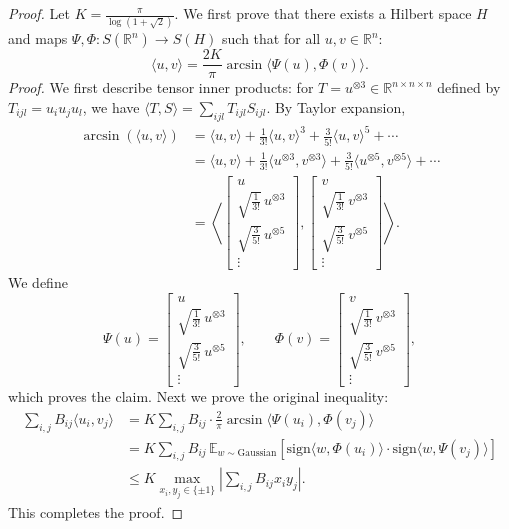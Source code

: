 \begin{proof}
Let $K = \frac{\pi}{\log(1 + \sqrt{2})}$.
We first prove that there exists a Hilbert space $H$ and maps $\Psi, \Phi : S(\mathbb{R}^n) \to S(H)$ such that for all $u, v \in \mathbb{R}^n$:
\[
\langle u, v \rangle = \frac{2K}{\pi} \arcsin \langle \Psi(u), \Phi(v) \rangle.
\]
\textit{Proof.} We first describe tensor inner products: for $T = u^{\otimes 3} \in \mathbb{R}^{n \times n \times n}$ defined by $T_{ijl} = u_i u_j u_l$, we have $\langle T, S \rangle = \sum_{ijl} T_{ijl} S_{ijl}$. By Taylor expansion,
\begin{align*}
\arcsin(\langle u, v \rangle) &= \langle u, v \rangle + \frac{1}{3!} \langle u, v \rangle^3 + \frac{3}{5!} \langle u, v \rangle^5 + \cdots \\
&= \langle u, v \rangle + \frac{1}{3!} \langle u^{\otimes 3}, v^{\otimes 3} \rangle + \frac{3}{5!} \langle u^{\otimes 5}, v^{\otimes 5} \rangle + \cdots \\
&= \left\langle 
\begin{bmatrix} u \\ \sqrt{\frac{1}{3!}}\, u^{\otimes 3} \\ \sqrt{\frac{3}{5!}}\, u^{\otimes 5} \\ \vdots \end{bmatrix},
\begin{bmatrix} v \\ \sqrt{\frac{1}{3!}}\, v^{\otimes 3} \\ \sqrt{\frac{3}{5!}}\, v^{\otimes 5} \\ \vdots \end{bmatrix}
\right\rangle.
\end{align*}
We define
\[
\Psi(u) = \begin{bmatrix} u \\ \sqrt{\frac{1}{3!}}\, u^{\otimes 3} \\ \sqrt{\frac{3}{5!}}\, u^{\otimes 5} \\ \vdots \end{bmatrix}, \qquad
\Phi(v) = \begin{bmatrix} v \\ \sqrt{\frac{1}{3!}}\, v^{\otimes 3} \\ \sqrt{\frac{3}{5!}}\, v^{\otimes 5} \\ \vdots \end{bmatrix},
\]
which proves the claim. Next we prove the original inequality:
\begin{align*}
\sum_{i,j} B_{ij} \langle u_i, v_j \rangle 
&= K \sum_{i,j} B_{ij} \cdot \frac{2}{\pi} \arcsin \langle \Psi(u_i), \Phi(v_j) \rangle \\
&= K \sum_{i,j} B_{ij}\, \mathbb{E}_{w \sim \text{Gaussian}}\!\left[ \mathrm{sign}\langle w, \Phi(u_i) \rangle \cdot \mathrm{sign}\langle w, \Psi(v_j) \rangle \right] \\
&\leq K \max_{x_i, y_j \in \{\pm 1\}} \left| \sum_{i,j} B_{ij} x_i y_j \right|.
\end{align*}
This completes the proof. \qedhere
\end{proof}

